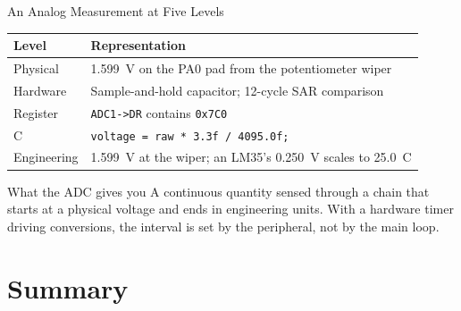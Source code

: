 \documentclass[9pt,aspectratio=169,xcolor=table]{beamer}
\begin{document}
\begin{frame}{An Analog Measurement at Five Levels}
    \begin{center}
    {\small
    \striped
    \begin{tabular}{@{}l R{.65\textwidth}@{}}
        \toprule
        \textbf{Level} & \textbf{Representation} \\
        \midrule
        Physical    & 1.599~V on the PA0 pad from the potentiometer wiper \\
        Hardware    & Sample-and-hold capacitor; 12-cycle SAR comparison \\
        Register    & \texttt{ADC1->DR} contains \texttt{0x7C0} \\
        C           & \texttt{voltage = raw * 3.3f / 4095.0f;} \\
        Engineering & 1.599~V at the wiper; an LM35's 0.250~V scales to 25.0~\textdegree{}C \\
        \bottomrule
    \end{tabular}}
    \end{center}

    \vspace{3mm}
    \begin{block}{What the ADC gives you}
        A continuous quantity sensed through a chain that starts at a
        physical voltage and ends in engineering units. With a hardware
        timer driving conversions, the interval is set by the peripheral,
        not by the main loop.
    \end{block}
\end{frame}


\section{Summary}
\end{document}
